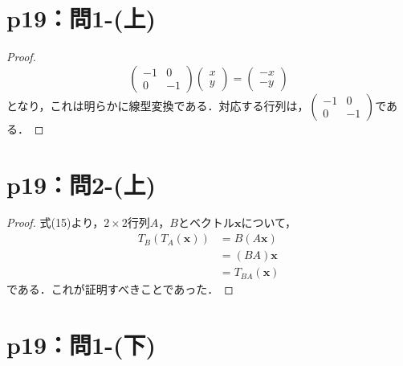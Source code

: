 \documentclass[a4paper,10pt,fleqn]{ltjsarticle}
\begin{document}
\section*{p19：問1-(上)}
%
%
\begin{tleftbar}
  \begin{proof}
    \[
      \begin{pmatrix}
        -1 & 0  \\
        0  & -1
      \end{pmatrix}
      \begin{pmatrix}
        x \\
        y
      \end{pmatrix}
      =
      \begin{pmatrix}
        -x \\
        -y
      \end{pmatrix}
    \]
    となり，これは明らかに線型変換である．対応する行列は，$
      \begin{pmatrix}
        -1 & 0  \\
        0  & -1
      \end{pmatrix}
    $である．
  \end{proof}
\end{tleftbar}

\section*{p19：問2-(上)}
\begin{tleftbar}
  \begin{proof}
    式(15)より，$2 \times 2$行列$A$，$B$とベクトル$\bm{x}$について，
    \begin{align*}
      T_B (T_A (\bm{x})) & = B(A\bm{x})      \\
                         & = (BA) \bm{x}     \\
                         & = T_{BA} (\bm{x})
    \end{align*}
    である．これが証明すべきことであった．
  \end{proof}
\end{tleftbar}


\section*{p19：問1-(下)}
\end{document}
